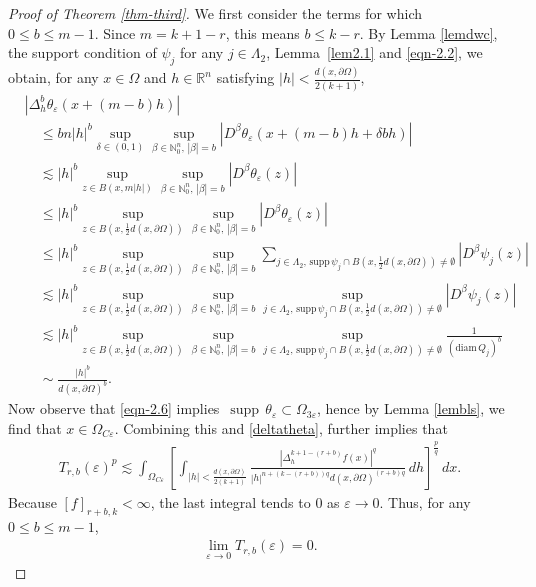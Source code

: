 \documentclass[11pt,twoside]{article}
\def\rn{{\mathbb{R}^n}}
\def\boz{{\Omega}}
\def\vez{\varepsilon}
\def\pa{\partial}                %
\def\supp{\mathop\mathrm{\,supp\,}}
\theoremstyle{mylem}
\theoremstyle{definition}
\numberwithin{equation}{section}
\begin{document}
\begin{proof}[Proof of Theorem \ref{thm-third}]
We first consider the terms for which $0\le b\le m-1$.  Since $m=k+1-r$, this means $b\le k-r$.  By Lemma \ref{lemdwc}, the support condition of $\psi_j$ for any $j\in\Lambda_2$,
Lemma~\ref{lem2.1} and \eqref{eqn-2.2}, we obtain, for any $x\in\boz$ and $h\in\rn$ satisfying $|h|<\frac{d(x,\pa\boz)}{2(k+1)}$,
\begin{align}\label{deltatheta}
&\left|\Delta_h^b\theta_\vez(x+(m-b)h)\right|\nonumber\\
&\quad\leq bn|h|^b\sup_{\delta\in(0,1)}\sup_{\beta\in\mathbb{N}_0^n,\,|\beta|=b}
\left|D^\beta \theta_\varepsilon(x+(m-b)h+\delta bh)\right|\nonumber\\
&\quad\lesssim|h|^b\sup_{z\in B(x,m|h|)}\sup_{\beta\in\mathbb{N}_0^n,\,|\beta|=b}
\left|D^\beta \theta_\varepsilon(z)\right|\nonumber\\
&\quad\leq|h|^b\sup_{z\in B(x,\frac{1}{2}d(x,\pa\boz))}\sup_{\beta\in\mathbb{N}_0^n,\,|\beta|=b}
\left|D^\beta \theta_\varepsilon(z)\right|\nonumber\\
&\quad\leq|h|^b\sup_{z\in B(x,\frac{1}{2}d(x,\pa\boz))}\sup_{\beta\in\mathbb{N}_0^n,\,|\beta|=b}\sum_{j\in\Lambda_2,\,\mathrm{supp\,}\psi_j\cap B(x,\frac{1}{2}d(x,\pa\boz))\neq\emptyset}
\left|D^\beta\psi_j(z)\right|\nonumber\\
&\quad\lesssim|h|^b\sup_{z\in B(x,\frac{1}{2}d(x,\pa\boz))}\sup_{\beta\in\mathbb{N}_0^n,\,|\beta|=b}\sup_{j\in\Lambda_2,\,\mathrm{supp\,}\psi_j\cap B(x,\frac{1}{2}d(x,\pa\boz))\neq\emptyset}
\left|D^\beta\psi_j(z)\right|\nonumber\\
&\quad\lesssim|h|^b\sup_{z\in B(x,\frac{1}{2}d(x,\pa\boz))}\sup_{\beta\in\mathbb{N}_0^n,\,|\beta|=b}\sup_{j\in\Lambda_2,\,\mathrm{supp\,}\psi_j\cap B(x,\frac{1}{2}d(x,\pa\boz))\neq\emptyset}
\frac{1}{(\mathrm{diam\,}Q_j)^b}\nonumber\\
&\quad\sim\frac{|h|^b}{d(x,\pa\boz)^b}.
\end{align}
Now observe that \eqref{eqn-2.6} implies $\supp\theta_\vez\subset\boz_{3\varepsilon}$, hence by Lemma \ref{lembls}, we find that $x\in\boz_{C\vez}$. Combining this and \eqref{deltatheta}, further implies that
\begin{align*}
T_{r,b}(\vez)^p
\lesssim
\int_{\boz_{C\vez}}
\left[
\int_{|h|<\frac{d(x,\pa\boz)}{2(k+1)}}
\frac{|\Delta_h^{k+1-(r+b)}f(x)|^q}
{|h|^{n+(k-(r+b))q}d(x,\pa\boz)^{(r+b)q}}
\,d h
\right]^\frac{p}{q}
\,d x.
\end{align*}
Because $[f]_{r+b,k}<\infty$, the last integral tends to $0$ as $\vez\to0$.
Thus, for any $0\le b\le m-1$,
\begin{align*}
\lim_{\vez\to0}T_{r,b}(\vez)	=0.
\end{align*}


\end{proof}
\end{document}
